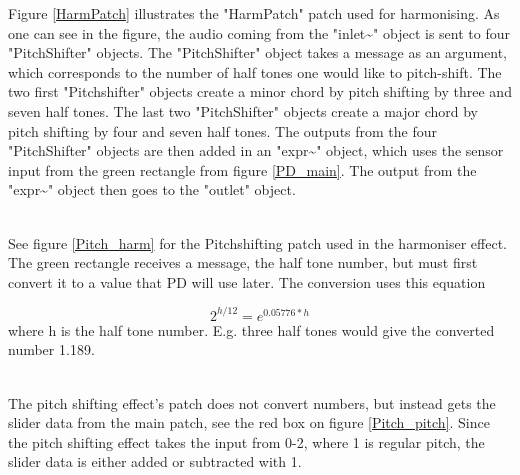 Figure \ref{HarmPatch} illustrates the "HarmPatch" patch used for harmonising. As one can see in the figure, the audio coming from the "inlet\textasciitilde" object is sent to four "PitchShifter" objects. The "PitchShifter" object takes a message as an argument, which corresponds to the number of half tones one would like to pitch-shift. The two first "Pitchshifter" objects create a minor chord by pitch shifting by three and seven half tones.  The last two "PitchShifter" objects create a major chord by pitch shifting by four and seven half tones. The outputs from the four "PitchShifter" objects are then added in an "expr\textasciitilde" object, which uses the sensor input from the green rectangle from figure \ref{PD_main}. The output from the "expr\textasciitilde" object then goes to the "outlet" object.
 
\begin{minipage}{\linewidth}%
\label{HarmPatch}
\end{minipage}\\

See figure \ref{Pitch_harm} for the Pitchshifting patch used in the harmoniser effect. The green rectangle receives a message, the half tone number, but must first convert it to a value that PD will use later. The conversion uses this equation\citep{Puckette_2006}

\[ 2^{h/12} = e^{0.05776*h} \] where h is the half tone number. E.g. three half tones would give the converted number 1.189. \\

\begin{minipage}{\linewidth}%
\label{Pitch_harm}
\end{minipage}\\

The pitch shifting effect's patch does not convert numbers, but instead gets the slider data from the main patch, see the red box on figure \ref{Pitch_pitch}. Since the pitch shifting effect takes the input from 0-2, where 1 is regular pitch, the slider data is either added or subtracted with 1. 

